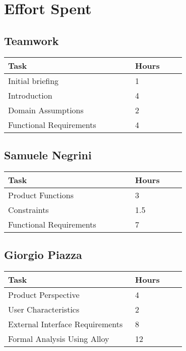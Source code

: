 \chapter{Effort Spent}

\section{Teamwork}
\vspace{2mm}
\begin{center}
    \begin{tabular}{@{}p{0.5\linewidth} p{0.2\linewidth}@{}}
        \hline
        \textbf{Task} & \textbf{Hours} \\ \hline
        Initial briefing & 1 \\ \hline
        Introduction & 4 \\ \hline
        Domain Assumptions & 2 \\ \hline
        Functional Requirements & 4 \\ \hline
    \end{tabular}
\end{center}

\section{Samuele Negrini}
\vspace{2mm}
\begin{center}
	\begin{tabular}{@{}p{0.5\linewidth} p{0.2\linewidth}@{}}
		\hline
		\textbf{Task} & \textbf{Hours} \\ \hline
		Product Functions & 3 \\ \hline
		Constraints & 1.5 \\ \hline
        Functional Requirements & 7 \\ \hline
	\end{tabular}
\end{center}

\section{Giorgio Piazza}
\vspace{2mm}
\begin{center}
	\begin{tabular}{@{}p{0.5\linewidth} p{0.2\linewidth}@{}}
		\hline
		\textbf{Task} & \textbf{Hours} \\ \hline
		Product Perspective & 4 \\ \hline
		User Characteristics & 2 \\ \hline
		External Interface Requirements & 8 \\ \hline
		Formal Analysis Using Alloy & 12 \\ \hline 
	\end{tabular}
\end{center}